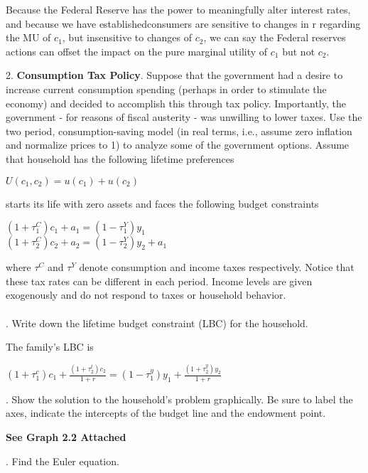 \documentclass[11pt]{SelfArxOneColBMN}
\begin{document}
\begin{solution}
  Because the Federal Reserve has the power to meaningfully alter interest rates, and because we have establishedconsumers are sensitive to changes in r regarding the MU of $c_1$, but insensitive to changes of $c_2$, we can say the Federal reserves actions can offset the impact on the pure marginal utility of $c_1$ but not $c_2$. 
\end{solution}
2. \textbf{Consumption Tax Policy}. Suppose that the government had a desire to increase current consumption spending (perhaps in order to stimulate the economy) and decided to accomplish this through tax policy. Importantly, the government - for reasons of fiscal austerity - was unwilling to lower taxes. Use the two period, consumption-saving model (in real terms, i.e., assume zero inflation and normalize prices to 1) to analyze some of the government options. Assume that household has the following lifetime preferences
\begin{center}
	$U(c_1,c_2) = u(c_1) + u(c_2)$
\end{center}
starts its life with zero assets and faces the following budget constraints
\begin{center}
	$(1 + \tau_1^C)c_1 + a_1 = (1 - \tau_1^Y)y_1$\\
	$(1 + \tau_2^C)c_2 + a_2 = (1 - \tau_2^Y)y_2 + a_1$
\end{center}
where $\tau^C$ and $\tau^Y$ denote consumption and income taxes respectively. Notice that these tax rates can be different in each period. Income levels are given exogenously and do not respond to taxes or household behavior.\\
\\
. Write down the lifetime budget constraint (LBC) for the household.\\
\begin{solution}
The family's LBC is
  \begin{center}
    $(1 + \tau_1^c)c_1 + \frac{(1 + \tau_2^t)c_2}{1 + r} = (1 - \tau_1^y)y_1 + \frac{(1 + \tau_2^y)y_2}{1 + r}$
  \end{center}
\end{solution}
. Show the solution to the household's problem graphically. Be sure to label the axes, indicate the intercepts of the budget line and the endowment point.\\
\begin{solution}
  \textbf{See Graph 2.2 Attached}
\end{solution}
. Find the Euler equation.\\
\end{document}
